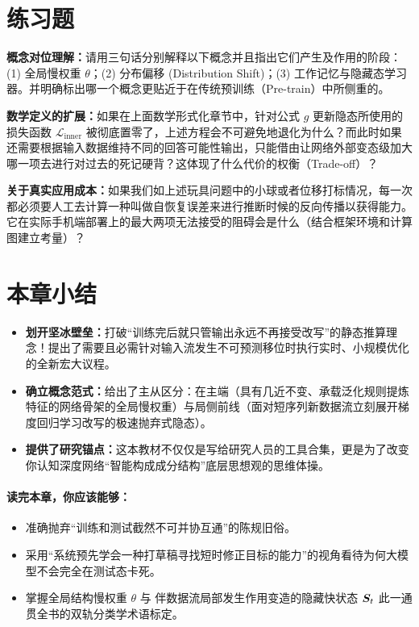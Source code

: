 \section{练习题}
\label{sec:intro_exercises}

\begin{exercise}
\textbf{概念对位理解：}请用三句话分别解释以下概念并且指出它们产生及作用的阶段：(1) 全局慢权重 $\theta$；(2) 分布偏移 (Distribution Shift)；(3) 工作记忆与隐藏态学习器。并明确标出哪一个概念更贴近于在传统预训练（Pre-train）中所侧重的。
\end{exercise}

\begin{exercise}
\textbf{数学定义的扩展：}如果在上面数学形式化章节中，针对公式 $g$ 更新隐态所使用的损失函数 $\mathcal{L}_{\text{inner}}$ 被彻底置零了，上述方程会不可避免地退化为什么？而此时如果还需要根据输入数据维持不同的回答可能性输出，只能借由让网络外部变态级加大哪一项去进行对过去的死记硬背？这体现了什么代价的权衡（Trade-off）？
\end{exercise}

\begin{exercise}
\textbf{关于真实应用成本：}如果我们如上述玩具问题中的小球或者位移打标情况，每一次都必须要人工去计算一种叫做自恢复误差来进行推断时候的反向传播以获得能力。它在实际手机端部署上的最大两项无法接受的阻碍会是什么（结合框架环境和计算图建立考量）？
\end{exercise}

\section{本章小结}
\label{sec:intro_summary}

\begin{itemize}
    \item \textbf{划开坚冰壁垒：}打破“训练完后就只管输出永远不再接受改写”的静态推算理念！提出了需要且必需针对输入流发生不可预测移位时执行实时、小规模优化的全新宏大议程。
    \item \textbf{确立概念范式：}给出了主从区分：在主端（具有几近不变、承载泛化规则提炼特征的网络骨架的全局慢权重）与局侧前线（面对短序列新数据流立刻展开梯度回归学习改写的极速抛弃式隐态）。
    \item \textbf{提供了研究锚点：}这本教材不仅仅是写给研究人员的工具合集，更是为了改变你认知深度网络“智能构成成分结构”底层思想观的思维体操。
\end{itemize}

\paragraph{读完本章，你应该能够：}
\begin{itemize}
    \item 准确抛弃“训练和测试截然不可并协互通”的陈规旧俗。
    \item 采用“系统预先学会一种打草稿寻找短时修正目标的能力”的视角看待为何大模型不会完全在测试态卡死。
    \item 掌握全局结构慢权重 $\theta$ 与 伴数据流局部发生作用变造的隐藏快状态 $\boldsymbol{S}_t$ 此一通贯全书的双轨分类学术语标定。
\end{itemize}
